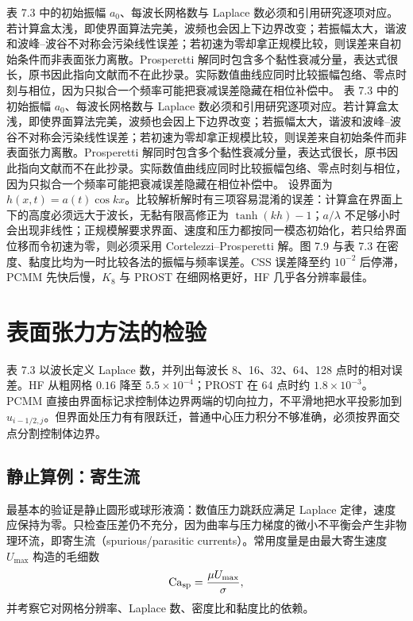 \documentclass[11pt,a4paper,openany,fontset=none]{ctexbook}
\begin{document}
表 7.3 中的初始振幅 $a_0$、每波长网格数与 Laplace 数必须和引用研究逐项对应。若计算盒太浅，即使界面算法完美，波频也会因上下边界改变；若振幅太大，谐波和波峰--波谷不对称会污染线性误差；若初速为零却拿正规模比较，则误差来自初始条件而非表面张力离散。Prosperetti 解同时包含多个黏性衰减分量，表达式很长，原书因此指向文献而不在此抄录。实际数值曲线应同时比较振幅包络、零点时刻与相位，因为只拟合一个频率可能把衰减误差隐藏在相位补偿中。
表 7.3 中的初始振幅 $a_0$、每波长网格数与 Laplace 数必须和引用研究逐项对应。若计算盒太浅，即使界面算法完美，波频也会因上下边界改变；若振幅太大，谐波和波峰--波谷不对称会污染线性误差；若初速为零却拿正规模比较，则误差来自初始条件而非表面张力离散。Prosperetti 解同时包含多个黏性衰减分量，表达式很长，原书因此指向文献而不在此抄录。实际数值曲线应同时比较振幅包络、零点时刻与相位，因为只拟合一个频率可能把衰减误差隐藏在相位补偿中。
设界面为 $h(x,t)=a(t)\cos kx$。比较解析解时有三项容易混淆的误差：计算盒在界面上下的高度必须远大于波长，无黏有限高修正为 $\tanh(kh)-1$；$a/\lambda$ 不足够小时会出现非线性；正规模解要求界面、速度和压力都按同一模态初始化，若只给界面位移而令初速为零，则必须采用 Cortelezzi--Prosperetti 解。图 7.9 与表 7.3 在密度、黏度比均为一时比较各法的振幅与频率误差。CSS 误差降至约 $10^{-2}$ 后停滞，PCMM 先快后慢，$K_8$ 与 PROST 在细网格更好，HF 几乎各分辨率最佳。
\section{表面张力方法的检验}

表 7.3 以波长定义 Laplace 数，并列出每波长 8、16、32、64、128 点时的相对误差。HF 从粗网格 $0.16$ 降至 $5.5\times10^{-4}$；PROST 在 64 点时约 $1.8\times10^{-3}$。PCMM 直接由界面标记求控制体边界两端的切向拉力，不平滑地把水平投影加到 $u_{i-1/2,j}$。但界面处压力有有限跃迁，普通中心压力积分不够准确，必须按界面交点分割控制体边界。
\subsection{静止算例：寄生流}

最基本的验证是静止圆形或球形液滴：数值压力跳跃应满足 Laplace 定律，速度应保持为零。只检查压差仍不充分，因为曲率与压力梯度的微小不平衡会产生非物理环流，即寄生流（spurious/parasitic currents）。常用度量是由最大寄生速度 $U_{\max}$ 构造的毛细数
\begin{equation}
 \mathrm{Ca}_{\rm sp}=\frac{\mu U_{\max}}{\sigma},
\end{equation}
并考察它对网格分辨率、Laplace 数、密度比和黏度比的依赖。
\end{document}
